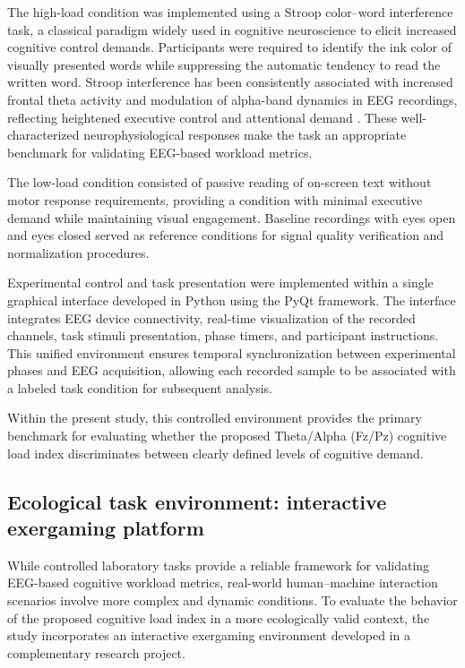 \documentclass[10pt]{iopart}
\begin{document}
The high-load condition was implemented using a Stroop color--word interference task, a classical paradigm widely used in cognitive neuroscience to elicit increased cognitive control demands. Participants were required to identify the ink color of visually presented words while suppressing the automatic tendency to read the written word. Stroop interference has been consistently associated with increased frontal theta activity and modulation of alpha-band dynamics in EEG recordings, reflecting heightened executive control and attentional demand \cite{c5,Nigbur2011_ThetaCognitiveInterference}. These well-characterized neurophysiological responses make the task an appropriate benchmark for validating EEG-based workload metrics.

The low-load condition consisted of passive reading of on-screen text without motor response requirements, providing a condition with minimal executive demand while maintaining visual engagement. Baseline recordings with eyes open and eyes closed served as reference conditions for signal quality verification and normalization procedures.

Experimental control and task presentation were implemented within a single graphical interface developed in Python using the PyQt framework. The interface integrates EEG device connectivity, real-time visualization of the recorded channels, task stimuli presentation, phase timers, and participant instructions. This unified environment ensures temporal synchronization between experimental phases and EEG acquisition, allowing each recorded sample to be associated with a labeled task condition for subsequent analysis.

Within the present study, this controlled environment provides the primary benchmark for evaluating whether the proposed Theta/Alpha (Fz/Pz) cognitive load index discriminates between clearly defined levels of cognitive demand.



\subsection{Ecological task environment: interactive exergaming platform}

While controlled laboratory tasks provide a reliable framework for validating EEG-based cognitive workload metrics, real-world human–machine interaction scenarios involve more complex and dynamic conditions. To evaluate the behavior of the proposed cognitive load index in a more ecologically valid context, the study incorporates an interactive exergaming environment developed in a complementary research project.
\end{document}
